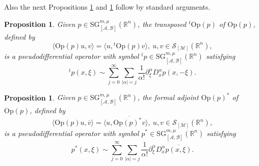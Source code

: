 \documentclass[11pt,reqno]{amsart}
\numberwithin{equation}{section}
\newtheorem{proposition}[theorem]{Proposition}
\newcommand{\R}{{\mathbb{R}}} %
\newcommand{\caS}{{\mathcal{S}}}
\newcommand{\SG}{{\mathrm{SG}}}
\newcommand{\M}{{\mathcal{M}}} %
\newcommand{\A}{{\mathcal{A}}} %
\newcommand{\B}{{\mathcal{B}}} %
\begin{document}
Also the next Propositions \ref{asympt_exp_tr} and \ref{asympt_exp_adj} follow by standard arguments.

\begin{proposition}\label{asympt_exp_tr}
	Given $p\in {\SG}_{[\A,\B]}^{m,\mu}(\mathbb{R}^n)$, the transposed ${}^t\mathrm{Op}(p)$ of $\mathrm{Op}(p)$, defined by
	\begin{equation*}
		\langle \mathrm{Op}(p)u, v\rangle = \langle u,{}^t\mathrm{Op}(p)v\rangle,\ u,v\in\mathcal{S}_{[\M]}(\mathbb{R}^n),
	\end{equation*}
	is a pseudodifferential operator with symbol ${}^tp\in {\SG}_{[\A,\B]}^{m,\mu}(\mathbb{R}^n)$ satisfying
	\begin{equation*}
		{}^tp(x,\xi)\sim \sum_{j=0}^\infty\sum_{|\alpha|=j}\frac{1}{\alpha!}\partial_\xi^\alpha D_x^\alpha p(x,-\xi).
	\end{equation*}
\end{proposition}
%



\begin{proposition}\label{asympt_exp_adj}
	Given $p\in {\SG}_{[\A,\B]}^{m,\mu}(\R^n)$, the formal adjoint $\mathrm{Op}(p)^*$ of $\mathrm{Op}(p)$, defined by
	\begin{equation*}
		\langle \mathrm{Op}(p)u,\overline{v}\rangle = \langle u,\overline{\mathrm{Op}(p)^*v}\rangle,\ u,v\in\caS_{[\M]}(\mathbb{R}^n),
	\end{equation*}
	is a pseudodifferential operator with symbol $p^*\in {\SG}_{[\A,\B]}^{m,\mu}(\R^n)$ satisfying
	\begin{equation*}
		p^*(x,\xi)\sim \sum_{j=0}^\infty\sum_{|\alpha|=j}\frac{1}{\alpha!}\partial_\xi^\alpha D_x^\alpha \overline{p(x,\xi)}.
	\end{equation*}
\end{proposition}
%
\end{document}
